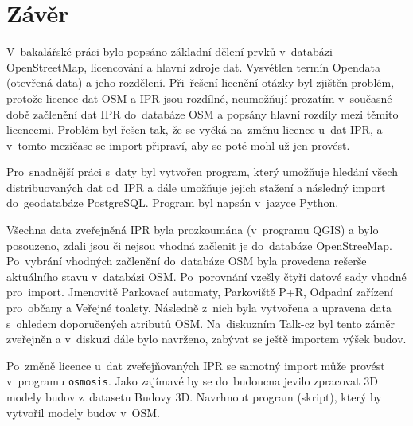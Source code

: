 \chapter*{Závěr}
\label{5-zaver}

V~bakalářské práci bylo popsáno základní dělení prvků v~databázi
OpenStreetMap, licencování a hlavní zdroje dat. Vysvětlen termín
Opendata (otevřená data) a jeho rozdělení.
Při~řešení licenční otázky byl zjištěn problém, protože licence dat
OSM a IPR jsou rozdílné, neumožňují prozatím v~současné době začlenění
dat IPR do~databáze OSM a popsány hlavní rozdíly mezi těmito licencemi.
Problém byl řešen tak, že se vyčká na~změnu licence u~dat IPR, a
v~tomto mezičase se import připraví, aby se poté mohl už jen provést.


Pro~snadnější práci s~daty byl vytvořen program, který umožňuje hledání
všech distribuovaných dat od~IPR a dále umožňuje jejich stažení a
následný import do~geodatabáze PostgreSQL. Program byl napsán v~jazyce
Python.


Všechna data zveřejněná IPR byla prozkoumána (v~programu QGIS)
a bylo posouzeno, zdali jsou či nejsou vhodná začlenit je do~databáze
OpenStreeMap. Po~vybrání vhodných začlenění do~databáze OSM byla
provedena rešerše aktuálního stavu v~databázi OSM.
Po~porovnání vzešly čtyři datové sady vhodné pro~import.
Jmenovitě Parkovací automaty, Parkoviště P+R, Odpadní zařízení
pro~občany a Veřejné toalety. Následně z~nich byla vytvořena a upravena
data s~ohledem doporučených atributů OSM.
Na~diskuzním Talk-cz byl tento záměr zveřejněn a v~diskuzi dále bylo
navrženo, zabývat se ještě importem výšek budov.


Po~změně licence u~dat zveřejňovaných IPR se samotný import může provést
v~programu {\tt osmosis}.
Jako zajímavé by se do~budoucna jevilo zpracovat 3D modely budov
z~datasetu Budovy 3D. Navrhnout program (skript), který by vytvořil
modely budov v~OSM.
